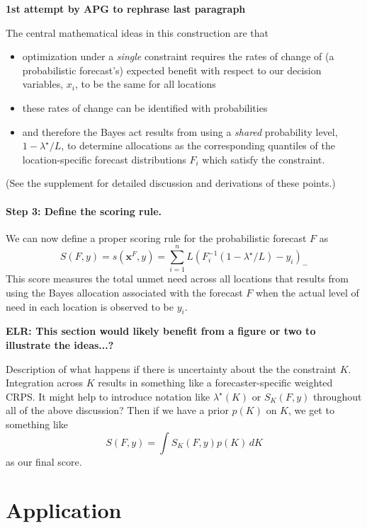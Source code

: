 \documentclass{article}
\begin{document}
\textbf{1st attempt by APG to rephrase last paragraph}

The central mathematical ideas in this construction are that 
\begin{itemize}
\item optimization under a \emph{single} constraint requires the rates of change of (a probabilistic forecast's) expected benefit with respect to our decision variables, $x_i$, to be the same for all locations 
\item these rates of change can be identified with probabilities
\item and therefore the Bayes act results from using a \emph{shared} probability level, $1 - \lambda^{\star}/L$, to determine allocations as the corresponding quantiles of the location-specific forecast distributions $F_i$ which satisfy the constraint.
\end{itemize}
(See the supplement for detailed discussion and derivations of these points.)
 
\paragraph{Step 3: Define the scoring rule.} We can now define a proper scoring rule for the probabilistic forecast $F$ as
\begin{equation}
S(F, y) = s(\mathbf{x}^F, y) = \sum_{i=1}^n L (F_i^{-1}(1 - \lambda^{\star}/L) - y_i)_-
\end{equation}
This score measures the total unmet need across all locations that results from using the Bayes allocation associated with the forecast $F$ when the actual level of need in each location is observed to be $y_i$.

\textbf{ELR: This section would likely benefit from a figure or two to illustrate the ideas...?}

Description of what happens if there is uncertainty about the the constraint $K$. Integration across $K$ results in something like a forecaster-specific weighted CRPS. It might help to introduce notation like $\lambda^{\star}(K)$ or $S_K(F, y)$ throughout all of the above discussion? Then if we have a prior $p(K)$ on $K$, we get to something like
$$S(F, y) = \int S_K(F,y) p(K) \, d K$$
as our final score.

\section{Application}
\label{sec:application}
\end{document}
